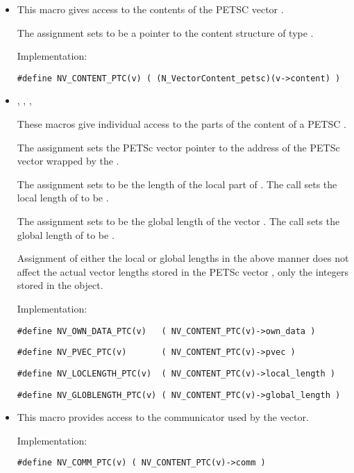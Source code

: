 \begin{itemize}

\item 

  This macro gives access to the contents of the PETSC
  vector .
  
  The assignment  sets       
   to be a pointer to the  content    
  structure of type .
  
  Implementation:
  
  \verb|#define NV_CONTENT_PTC(v) ( (N_VectorContent_petsc)(v->content) )|
  
\item 
  , , 
  , 
  
  These macros give individual access to the parts of    
  the content of a PETSC .                        
  
  The assignment  sets the PETSc vector
  pointer  to the address of the PETSc vector wrapped by
  the  .
  
  The assignment  sets  to be     
  the length of the local part of . 
  The call  sets      
  the local length of  to be .
  
  The assignment  sets  to  
  be the global length of the vector .                    
  The call  sets the global       
  length of  to be .
  
  {\warn}Assignment of either the local or global lengths in the above
  manner does not affect the actual vector lengths stored in the PETSc
  vector , only the integers stored in the {\nvecpetsc} object.
  
  Implementation:
  
  \verb|#define NV_OWN_DATA_PTC(v)   ( NV_CONTENT_PTC(v)->own_data )|

  \verb|#define NV_PVEC_PTC(v)       ( NV_CONTENT_PTC(v)->pvec )|

  \verb|#define NV_LOCLENGTH_PTC(v)  ( NV_CONTENT_PTC(v)->local_length )|

  \verb|#define NV_GLOBLENGTH_PTC(v) ( NV_CONTENT_PTC(v)->global_length )|
  
\item {}

  This macro provides access to the {\mpi} communicator used by the {\nvecpetsc}
  vector.

  Implementation:

  \verb|#define NV_COMM_PTC(v) ( NV_CONTENT_PTC(v)->comm )|

\end{itemize}
